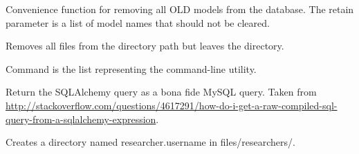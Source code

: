 \documentclass[letterpaper,10pt,english]{sphinxmanual}
\begin{document}

\begin{fulllineitems}
\label{api:old.lib.utils.clearAllModels}
Convenience function for removing all OLD models from the database.
The retain parameter is a list of model names that should not be cleared.

\end{fulllineitems}


\begin{fulllineitems}
\label{api:old.lib.utils.clearDirectoryOfFiles}
Removes all files from the directory path but leaves the directory.

\end{fulllineitems}


\begin{fulllineitems}
\label{api:old.lib.utils.commandLineProgramInstalled}
Command is the list representing the command-line utility.

\end{fulllineitems}


\begin{fulllineitems}
\label{api:old.lib.utils.compile_query}
Return the SQLAlchemy query as a bona fide MySQL query.  Taken from
\href{http://stackoverflow.com/questions/4617291/how-do-i-get-a-raw-compiled-sql-query-from-a-sqlalchemy-expression}{http://stackoverflow.com/questions/4617291/how-do-i-get-a-raw-compiled-sql-query-from-a-sqlalchemy-expression}.

\end{fulllineitems}


\begin{fulllineitems}
\label{api:old.lib.utils.createResearcherDirectory}
Creates a directory named researcher.username in files/researchers/.

\end{fulllineitems}
\end{document}
